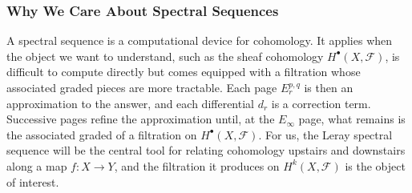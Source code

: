 \subsubsection{Why We Care About Spectral Sequences}
A spectral sequence is a computational device for cohomology. It
applies when the object we want to understand, such as the sheaf
cohomology $H^\bullet(X, \mathcal{F})$, is difficult to compute
directly but comes equipped with a filtration whose associated
graded pieces are more tractable. Each page $E_r^{p,q}$ is then an
approximation to the answer, and each differential $d_r$ is a correction term. Successive pages refine the approximation until, at
the $E_\infty$ page, what remains is the associated graded of a
filtration on $H^\bullet(X, \mathcal{F})$. For us, the Leray spectral
sequence will be the central tool for relating cohomology upstairs
and downstairs along a map $f : X \to Y$, and the filtration it
produces on $H^k(X, \mathcal{F})$ is the object of 
interest. 

